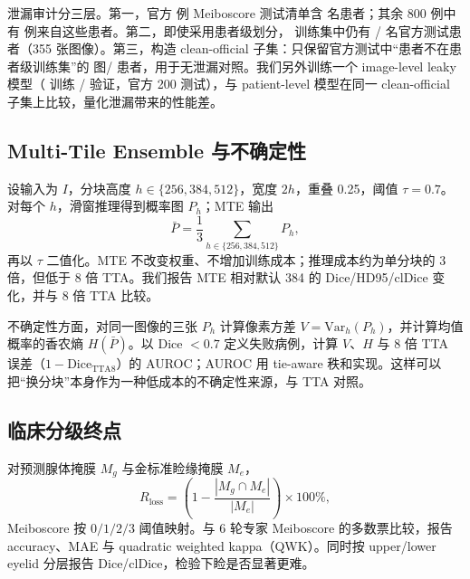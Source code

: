 泄漏审计分三层。第一，官方 \officialTestImages{} 例 Meiboscore 测试清单含 \officialTestPatients{} 名患者；其余 800 例中有 \officialLeakImages{} 例来自这些患者。第二，即使采用患者级划分，\nTrain{} 训练集中仍有 \officialLeakPatients/\officialTestPatients{} 名官方测试患者（355 张图像）。第三，构造 clean-official 子集：只保留官方测试中“患者不在患者级训练集”的 \cleanOfficialImages{} 图/\cleanOfficialPatients{} 患者，用于无泄漏对照。我们另外训练一个 image-level leaky 模型（\leakyTrainImages{} 训练 / \leakyValImages{} 验证，官方 200 测试），与 patient-level 模型在同一 clean-official 子集上比较，量化泄漏带来的性能差。

\subsection{Multi-Tile Ensemble 与不确定性}\label{sec:mte}

设输入为 $I$，分块高度 $h\in\{256,384,512\}$，宽度 $2h$，重叠 0.25，阈值 $\tau=0.7$。对每个 $h$，滑窗推理得到概率图 $P_h$；MTE 输出
\begin{equation}
\bar P=\frac{1}{3}\sum_{h\in\{256,384,512\}}P_h,
\end{equation}
再以 $\tau$ 二值化。MTE 不改变权重、不增加训练成本；推理成本约为单分块的 3 倍，但低于 8 倍 TTA。我们报告 MTE 相对默认 384 的 Dice/HD95/clDice 变化，并与 8 倍 TTA 比较。

不确定性方面，对同一图像的三张 $P_h$ 计算像素方差 $V=\mathrm{Var}_h(P_h)$，并计算均值概率的香农熵 $H(\bar P)$。以 Dice $<0.7$ 定义失败病例，计算 $V$、$H$ 与 8 倍 TTA 误差（$1-\mathrm{Dice}_{\mathrm{TTA8}}$）的 AUROC；AUROC 用 tie-aware 秩和实现。这样可以把“换分块”本身作为一种低成本的不确定性来源，与 TTA 对照。

\subsection{临床分级终点}\label{sec:clinical}

对预测腺体掩膜 $M_g$ 与金标准睑缘掩膜 $M_e$，
\begin{equation}
R_{\mathrm{loss}}=\left(1-\frac{|M_g\cap M_e|}{|M_e|}\right)\times100\%,
\end{equation}
Meiboscore 按 $0/1/2/3$ 阈值映射。与 6 轮专家 Meiboscore 的多数票比较，报告 accuracy、MAE 与 quadratic weighted kappa（QWK）。同时按 upper/lower eyelid 分层报告 Dice/clDice，检验下睑是否显著更难。
